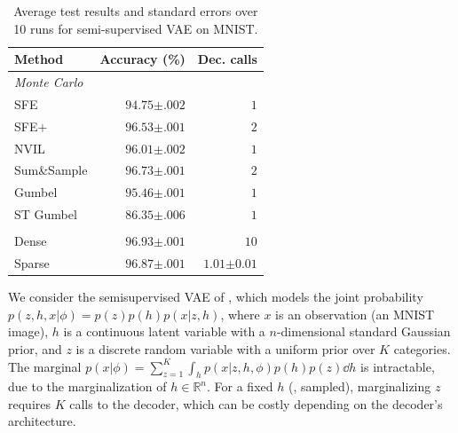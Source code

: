 \begin{table}[t]
    \centering
    \begin{tabular}{lrr}
        \toprule
        Method &
        Accuracy (\%)
               & Dec. calls                                                                 \\
        \midrule

        \multicolumn{3}{l}{\emph{Monte Carlo}}                                              \\
        SFE
               & $94.75${\tiny\color{gray}$\pm .002$} & $1$                                 \\
        SFE$+$
               & $96.53${\tiny\color{gray}$\pm .001$} & $2$                                 \\
        NVIL
               & $96.01${\tiny\color{gray}$\pm .002$} & $1$                                 \\
        Sum\&Sample
               & $96.73${\tiny\color{gray}$\pm .001$} & $2$                                 \\
        Gumbel
               & $95.46${\tiny\color{gray}$\pm .001$} & $1$                                 \\
        ST Gumbel
               & $86.35${\tiny\color{gray}$\pm .006$} & $1$                                 \\
        \spacerule
        \multicolumn{3}{l}{\emph{Marginalization}}                                          \\
        Dense
               & $96.93${\tiny\color{gray}$\pm .001$} & $10$                                \\
        Sparse {\small \color{gray}{(proposed)}}
               & $96.87${\tiny\color{gray}$\pm .001$} & $1.01${\tiny\color{gray}$\pm 0.01$} \\
        \bottomrule
    \end{tabular}
    \caption{\label{tab:ssvaeelbo}
        Average test results and standard errors over 10 runs for semi-supervised VAE on MNIST.}
\end{table}

We consider the semisupervised VAE of \citet{KingmaEtAl2014SSVAE},
which models the joint probability $p(z,h,x|\phi)=p(z)p(h)p(x|z,h)$, where
$x$ is an observation (an MNIST image), $h$ is a continuous latent
variable with a $n$-dimensional standard Gaussian prior, and $z$ is a
discrete random variable with a uniform prior over $K$ categories.
The marginal $p(x | \phi) = \sum_{z=1}^K \int_h p(x | z, h,
    \phi)p(h)p(z) \dd h$ is intractable, due to the marginalization of $h \in
    \mathbb R^n$. For a fixed $h$ (\eg, sampled), marginalizing $z$
requires $K$ calls to the decoder, which can be costly depending on
the decoder's architecture.

